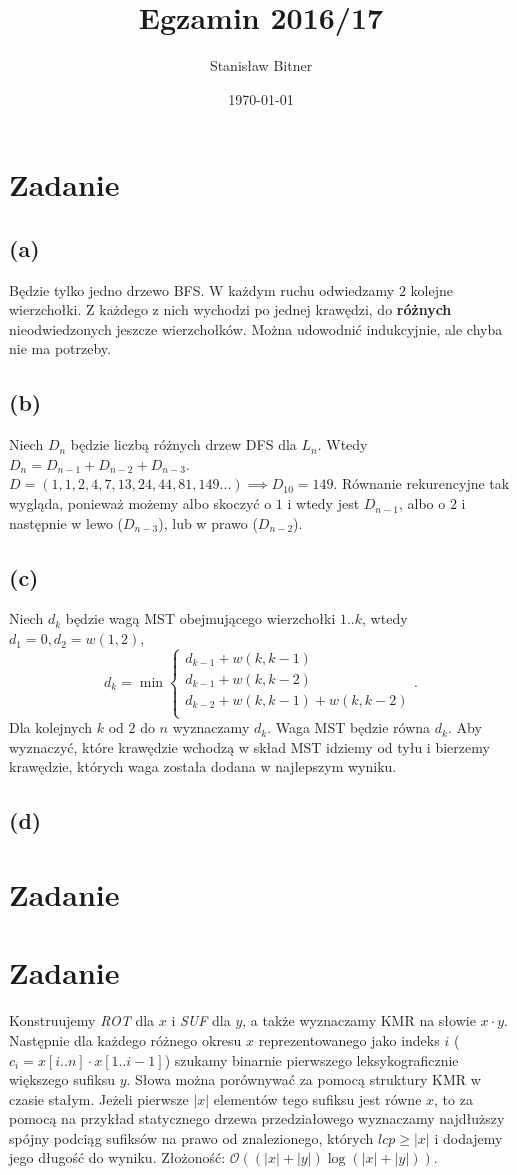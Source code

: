 \documentclass[12pt, a4paper]{article}
\title{Egzamin 2016/17}
\author{Stanisław Bitner}
\date{\today}
\newcommand{\MCALO}{\mathcal{O}}
\newcounter{zadanie}
\newcommand{\zadanie}{\addtocounter{zadanie}{1}\section*{Zadanie \arabic{zadanie}}}
\begin{document}
\maketitle
\zadanie{}
\subsection*{(a)}
Będzie tylko jedno drzewo BFS. W każdym ruchu odwiedzamy $2$ kolejne
wierzchołki. Z każdego z nich wychodzi po jednej krawędzi, do \textbf{różnych}
nieodwiedzonych jeszcze wierzchołków. Można udowodnić indukcyjnie, ale chyba
nie ma potrzeby.

\subsection*{(b)}
Niech $D_n$ będzie liczbą różnych drzew DFS dla $L_n$. Wtedy
$D_n = D_{n-1} + D_{n-2} + D_{n-3}$.\\ $D = (1,1,2,4,7,13,24,44,81,149...)
\implies D_{10} = 149$. Równanie rekurencyjne tak wygląda, ponieważ możemy albo
skoczyć o $1$ i wtedy jest $D_{n-1}$, albo o $2$ i następnie w lewo
($D_{n-3}$), lub w prawo ($D_{n-2}$).

\subsection*{(c)}
Niech $d_k$ będzie wagą MST obejmującego wierzchołki $1..k$, wtedy $d_1 = 0,
d_2 = w(1,2)$,
$$
d_k = \min\begin{cases}
        d_{k-1} + w(k,k-1)\\
        d_{k-1} + w(k,k-2)\\
        d_{k-2} + w(k,k-1) + w(k,k-2)\\
      \end{cases}
.
$$
Dla kolejnych $k$ od $2$ do $n$ wyznaczamy $d_k$. Waga MST będzie równa $d_k$.
Aby wyznaczyć, które krawędzie wchodzą w skład MST idziemy od tyłu i bierzemy
krawędzie, których waga została dodana w najlepszym wyniku.

\subsection*{(d)}

\zadanie{}

\zadanie{}
Konstruujemy \textit{ROT} dla $x$ i \textit{SUF} dla $y$, a także wyznaczamy
KMR na słowie $x \cdot y$. Następnie dla każdego różnego okresu $x$
reprezentowanego jako indeks $i$ ($c_i = x[i..n] \cdot x[1..i-1]$) szukamy
binarnie pierwszego leksykograficznie większego sufiksu $y$. Słowa można
porównywać za pomocą struktury KMR w czasie stałym. Jeżeli pierwsze $|x|$
elementów tego sufiksu jest równe $x$, to za pomocą na przykład statycznego
drzewa przedziałowego wyznaczamy najdłuższy spójny podciąg sufiksów na prawo od
znalezionego, których $lcp \ge |x|$ i dodajemy jego długość do wyniku.
Złożoność: $\MCALO((|x|+|y|)\log{(|x|+|y|)})$.
\end{document}
